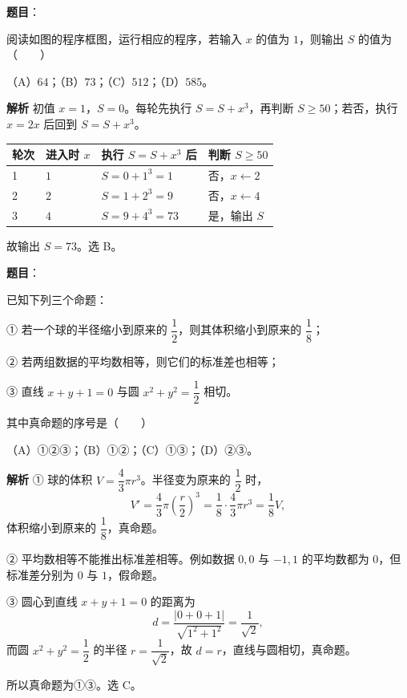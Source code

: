 \begin{answer}

\textbf{题目}：

阅读如图的程序框图，运行相应的程序，若输入 $x$ 的值为 $1$，则输出 $S$ 的值为\mbox{（　　）}
\nopagebreak[4]
\begin{center}\end{center}
\nopagebreak[4]
（A）$64$；（B）$73$；（C）$512$；（D）$585$。

\textbf{解析}
初值 $x=1$，$S=0$。每轮先执行 $S=S+x^3$，再判断 $S\geqslant 50$；若否，执行 $x=2x$ 后回到 $S=S+x^3$。

\begin{center}
\begin{tabular}{llll}
\toprule
轮次 & 进入时 $x$ & 执行 $S=S+x^3$ 后 & 判断 $S\geqslant 50$ \\
\midrule
1 & $1$ & $S=0+1^3=1$ & 否，$x\leftarrow 2$ \\
2 & $2$ & $S=1+2^3=9$ & 否，$x\leftarrow 4$ \\
3 & $4$ & $S=9+4^3=73$ & 是，输出 $S$ \\
\bottomrule
\end{tabular}
\end{center}

故输出 $S=73$。选 B。


\end{answer}
\begin{answer}

\textbf{题目}：

已知下列三个命题：

① 若一个球的半径缩小到原来的 $\dfrac12$，则其体积缩小到原来的 $\dfrac18$；

② 若两组数据的平均数相等，则它们的标准差也相等；

③ 直线 $x+y+1=0$ 与圆 $x^2+y^2=\dfrac12$ 相切。

其中真命题的序号是\mbox{（　　）}

（A）①②③；（B）①②；（C）①③；（D）②③。

\textbf{解析}
① 球的体积 $V=\dfrac43\pi r^3$。半径变为原来的 $\dfrac12$ 时，
\nopagebreak[4]
\[V'=\frac43\pi\left(\frac r2\right)^3=\frac18\cdot\frac43\pi r^3=\frac18V,\]
体积缩小到原来的 $\dfrac18$，真命题。

② 平均数相等不能推出标准差相等。例如数据 $0,0$ 与 $-1,1$ 的平均数都为 $0$，但标准差分别为 $0$ 与 $1$，假命题。

③ 圆心到直线 $x+y+1=0$ 的距离为
\nopagebreak[4]
\[d=\frac{|0+0+1|}{\sqrt{1^2+1^2}}=\frac1{\sqrt2},\]
而圆 $x^2+y^2=\dfrac12$ 的半径 $r=\dfrac1{\sqrt2}$，故 $d=r$，直线与圆相切，真命题。

所以真命题为①③。选 C。


\end{answer}

